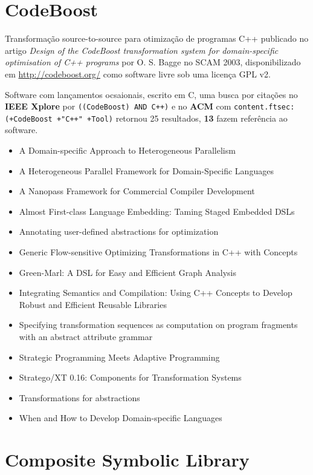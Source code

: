 \section{CodeBoost}

Transformação source-to-source para otimização de programas C++
publicado no artigo {\it Design of the CodeBoost transformation system for domain-specific optimisation of C++ programs}
por O. S. Bagge
no SCAM 2003,
disponibilizado em \url{http://codeboost.org/}
como software livre
sob uma licença GPL v2.

Software com lançamentos ocsaionais,
escrito em C,
uma busca por citações no {\bf IEEE Xplore} por
\texttt{((CodeBoost) AND C++)}
e no {\bf ACM} com
\texttt{content.ftsec:(+CodeBoost +"C++" +Tool)}
retornou
25 resultados,
{\bf 13} fazem referência ao software.

\begin{itemize}
\item A Domain-specific Approach to Heterogeneous Parallelism
\item A Heterogeneous Parallel Framework for Domain-Specific Languages
\item A Nanopass Framework for Commercial Compiler Development
\item Almost First-class Language Embedding: Taming Staged Embedded DSLs
\item Annotating user-defined abstractions for optimization
\item Generic Flow-sensitive Optimizing Transformations in C++ with Concepts
\item Green-Marl: A DSL for Easy and Efficient Graph Analysis
\item Integrating Semantics and Compilation: Using C++ Concepts to Develop Robust and Efficient Reusable Libraries
\item Specifying transformation sequences as computation on program fragments with an abstract attribute grammar
\item Strategic Programming Meets Adaptive Programming
\item Stratego/XT 0.16: Components for Transformation Systems
\item Transformations for abstractions
\item When and How to Develop Domain-specific Languages
\end{itemize}


\section{Composite Symbolic Library}

